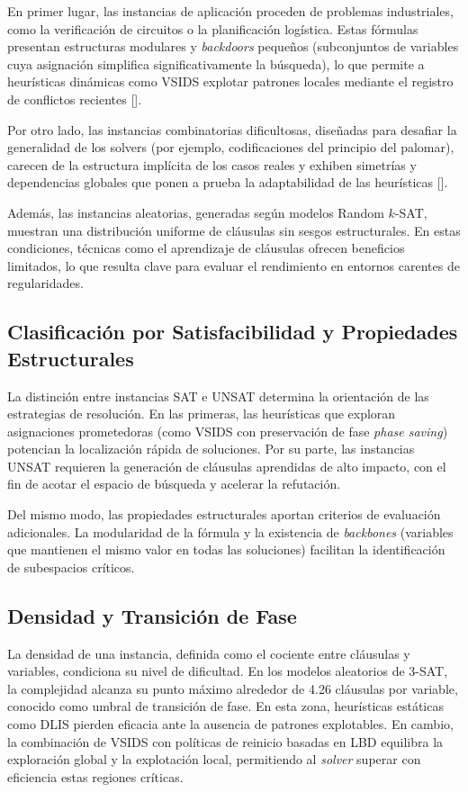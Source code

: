 En primer lugar, las instancias de aplicaci\'on proceden de problemas industriales, como la verificación de circuitos o la planificación logística. Estas fórmulas presentan estructuras modulares y \textit{backdoors} pequeños (subconjuntos de variables cuya asignación simplifica significativamente la búsqueda), lo que permite a heurísticas dinámicas como VSIDS explotar patrones locales mediante el registro de conflictos recientes [\cite{zulkoski2018understanding}].

Por otro lado, las instancias combinatorias dificultosas, diseñadas para desafiar la generalidad de los solvers (por ejemplo, codificaciones del principio del palomar), carecen de la estructura implícita de los casos reales y exhiben simetrías y dependencias globales que ponen a prueba la adaptabilidad de las heurísticas [\cite{zulkoski2018understanding}].

Además, las instancias aleatorias, generadas según modelos Random $k$-SAT, muestran una distribución uniforme de cláusulas sin sesgos estructurales. En estas condiciones, técnicas como el aprendizaje de cláusulas ofrecen beneficios limitados, lo que resulta clave para evaluar el rendimiento en entornos carentes de regularidades.

\subsection{Clasificación por Satisfacibilidad y Propiedades Estructurales}
La distinción entre instancias SAT e UNSAT determina la orientación de las estrategias de resolución. En las primeras, las heurísticas que exploran asignaciones prometedoras (como VSIDS con preservación de fase \textit{phase saving}) potencian la localizaci\'on r\'apida de soluciones. Por su parte, las instancias UNSAT requieren la generación de cláusulas aprendidas de alto impacto, con el fin de acotar el espacio de b\'usqueda y acelerar la refutación.

Del mismo modo, las propiedades estructurales aportan criterios de evaluación adicionales. La modularidad de la fórmula y la existencia de \textit{backbones} (variables que mantienen el mismo valor en todas las soluciones) facilitan la identificación de subespacios críticos.

\subsection{Densidad y Transición de Fase}
La densidad de una instancia, definida como el cociente entre cláusulas y variables, condiciona su nivel de dificultad. En los modelos aleatorios de 3-SAT, la complejidad alcanza su punto máximo alrededor de 4.26 cláusulas por variable, conocido como umbral de transición de fase. En esta zona, heurísticas estáticas como DLIS pierden eficacia ante la ausencia de patrones explotables. En cambio, la combinación de VSIDS con políticas de reinicio basadas en LBD equilibra la exploración global y la explotación local, permitiendo al \textit{solver} superar con eficiencia estas regiones críticas.

